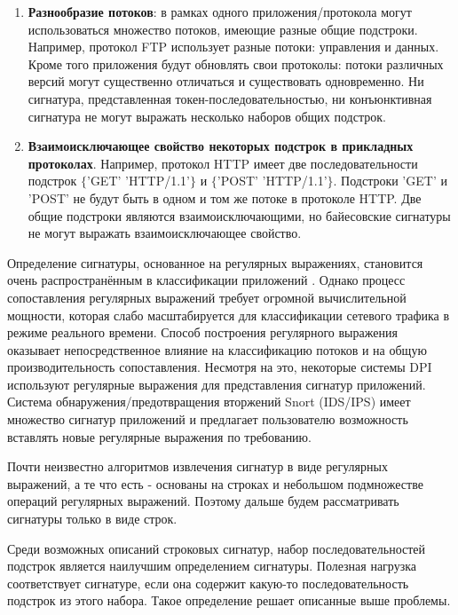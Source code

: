 \begin{enumerate}
    \item \textbf{Разнообразие потоков}: в рамках одного приложения/протокола могут использоваться множество потоков,
    имеющие разные общие подстроки. Например, протокол FTP использует разные потоки: управления и данных.
    Кроме того приложения будут обновлять свои протоколы: потоки различных версий могут существенно отличаться и существовать одновременно.
    Ни сигнатура, представленная токен-последовательностью,
    ни конъюнктивная сигнатура не могут выражать несколько наборов общих подстрок.
    \item \textbf{Взаимоисключающее свойство некоторых подстрок в прикладных протоколах}.
    Например, протокол HTTP имеет две последовательности подстрок $\{$'GET' 'HTTP/1.1'$\}$ и $\{$'POST' 'HTTP/1.1'$\}$.
    Подстроки 'GET' и 'POST' не будут быть в одном и том же потоке в протоколе HTTP.
    Две общие подстроки являются взаимоисключающими, но байесовские сигнатуры не могут выражать взаимоисключающее свойство.
\end{enumerate}

Определение сигнатуры, основанное на регулярных выражениях, становится очень распространённым в классификации приложений
\cite{szabo2012automatic, wang2012generating, vinothgeorge2013efficient}.
Однако процесс сопоставления регулярных выражений требует огромной вычислительной мощности,
которая слабо масштабируется для классификации сетевого трафика в режиме реального времени.
Способ построения регулярного выражения оказывает непосредственное влияние на классификацию потоков
и на общую производительность сопоставления.
Несмотря на это, некоторые системы DPI используют регулярные выражения для представления сигнатур приложений.
Система обнаружения/предотвращения вторжений Snort (IDS/IPS) \cite{Snort}
имеет множество сигнатур приложений и предлагает пользователю возможность вставлять новые регулярные выражения по требованию.

Почти неизвестно алгоритмов извлечения сигнатур в виде регулярных выражений, а те что есть -
основаны на строках и небольшом подмножестве операций регулярных выражений.
Поэтому дальше будем рассматривать сигнатуры только в виде строк.

Среди возможных описаний строковых сигнатур, набор последовательностей подстрок является наилучшим определением сигнатуры.
Полезная нагрузка соответствует сигнатуре, если она содержит какую-то последовательность подстрок из этого набора.
Такое определение решает описанные выше проблемы.

